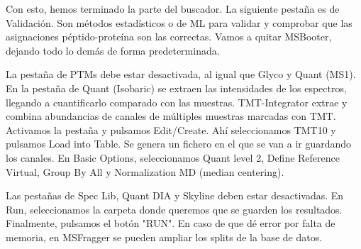 \documentclass[nochap]{config/ejercicios}
\begin{document}
Con esto, hemos terminado la parte del buscador. La siguiente pestaña es de Validación. Son métodos estadísticos o de ML para validar y comprobar que las asignaciones péptido-proteína son las correctas. Vamos a quitar MSBooter, dejando todo lo demás de forma predeterminada. 

La pestaña de PTMs debe estar desactivada, al igual que Glyco y Quant (MS1). En la pestaña de Quant (Isobaric) se extraen las intensidades de los espectros, llegando a cuantificarlo comparado con las muestras. TMT-Integrator extrae y combina abundancias de canales de múltiples muestras marcadas con TMT. Activamos la pestaña y pulsamos Edit/Create. Ahí seleccionamos TMT10 y pulsamos Load into Table. Se genera un fichero en el que se van a ir guardando los canales. En Basic Options, seleccionamos Quant level 2, Define Reference Virtual, Group By All y Normalization MD (median centering).

Las pestañas de Spec Lib, Quant DIA y Skyline deben estar desactivadas. En Run, seleccionamos la carpeta donde queremos que se guarden los resultados. Finalmente, pulsamos el botón "RUN". En caso de que dé error por falta de memoria, en MSFragger se pueden ampliar los splits de la base de datos. 
\end{document}

